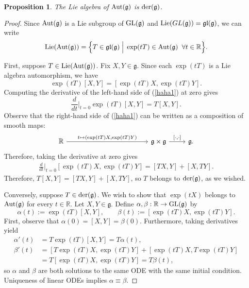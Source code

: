 \documentclass{amsart}
\newcommand{\R}{\mathbb R}
\newcommand{\lie}{\text{\normalfont Lie}}
\newcommand{\der}{\text{\normalfont der}}
\newcommand{\aut}{\text{\normalfont Aut}}
\newcommand{\GL}{\text{\normalfont GL}}
\newcommand{\gl}{\mathfrak{gl}}
\newcommand{\g}{\mathfrak g}
\theoremstyle{plain}
\newtheorem{proposition}[theorem]{Proposition}
\theoremstyle{definition}
\theoremstyle{remark}
\begin{document}
	



	

	\begin{proposition}
		The Lie algebra of $\aut(\g)$ is $\der(\g)$.
	\end{proposition}
	\begin{proof}
		Since $\aut(\g)$ is a Lie subgroup of $\GL(\g)$ and $\lie(GL(\g)) = \gl(\g)$, we can write 
		$$\lie(\aut(\g)) = \Big\{T \in \gl(\g) \; \Big| \; \exp(tT) \in \aut(\g)\;\; \forall t \in \R\Big\}.$$
		
		First, suppose $T \in \lie(\aut(\g))$. Fix $X,Y \in \g$. Since each $\exp(tT)$ is a Lie algebra automorphism, we have 
		\begin{equation}
			\label{haha1}
			\exp(tT)[X,Y] = [\exp(tT)X, \exp(tT)Y].
		\end{equation}
		Computing the derivative of the left-hand side of (\ref{haha1}) at zero gives 
		\begin{equation*}
			\frac{d}{dt}\bigg|_{t=0}\exp(tT)[X,Y]  = T[X,Y].
		\end{equation*}
		Observe that the right-hand side of (\ref{haha1}) can be written as a composition of smooth maps:
		$$\begin{tikzcd}
			\R \arrow{rrrrr}{t \mapsto (\exp(tT)X, \exp(tT)Y)}&&&&& \g \times \g  \arrow{r}{[\cdot,\cdot]}& \g.
		\end{tikzcd}$$
		Therefore, taking the derivative at zero gives
		\begin{align*}
			\frac{d}{dt}\bigg|_{t=0}[\exp(tT)X, \exp(tT)Y] = [TX,Y] + [X,TY].
		\end{align*}
		Therefore, $T[X,Y] = [TX,Y] + [X,TY]$, so $T$ belongs to $\der(\g)$, as we wished.
		
		Conversely, suppose $T \in \der(\g)$. We wish to show that $\exp(tX)$ belongs to $\aut(\g)$ for every $t \in \R$. Let $X,Y \in \g$. Define $\alpha,\beta: \R \rightarrow \GL(\g)$ by
		$$\alpha(t) := \exp(tT)[X,Y], \qquad \beta(t) := [\exp(tT)X,\exp(tT)Y].$$
		First, observe that $\alpha(0) = [X,Y] = \beta(0)$. Furthermore, taking derivatives yield 
		\begin{align*}
			\alpha'(t) &= T \exp(tT)[X,Y] = T \alpha(t), \\
			\beta'(t) &= [T \exp(tT)X, \exp(tT)Y] + [ \exp(tT)X, T\exp(tT)Y] \\
			&= T[\exp(tT)X,\exp(tT)Y] = T \beta(t),
		\end{align*}
		so $\alpha$ and $\beta$ are both solutions to the same ODE with the same initial condition. Uniqueness of linear ODEs implies $\alpha \equiv \beta$.
	\end{proof}
\end{document}
